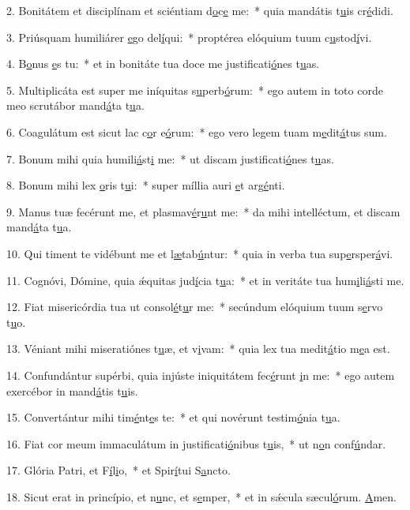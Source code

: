 2. Bonitátem et disciplínam et sciéntiam d\uline{o}c\uline{e} me:~* quia mandátis t\uline{u}is cr\uline{é}didi.\par 
3. Priúsquam humiliárer \uline{e}go del\uline{í}qui:~* proptérea elóquium tuum c\uline{u}stod\uline{í}vi.\par 
4. B\uline{o}nus \uline{e}s tu:~* et in bonitáte tua doce me justificati\uline{ó}nes t\uline{u}as.\par 
5. Multiplicáta est super me iníquitas s\uline{u}perb\uline{ó}rum:~* ego autem in toto corde meo scrutábor mand\uline{á}ta t\uline{u}a.\par 
6. Coagulátum est sicut lac c\uline{o}r e\uline{ó}rum:~* ego vero legem tuam m\uline{e}dit\uline{á}tus sum.\par 
7. Bonum mihi quia humili\uline{á}st\uline{i} me:~* ut discam justificati\uline{ó}nes t\uline{u}as.\par 
8. Bonum mihi lex \uline{o}ris t\uline{u}i:~* super míllia auri \uline{e}t arg\uline{é}nti.\par 
9. Manus tuæ fecérunt me, et plasmav\uline{é}r\uline{u}nt me:~* da mihi intelléctum, et discam mand\uline{á}ta t\uline{u}a.\par 
10. Qui timent te vidébunt me et l\uline{æ}tab\uline{ú}ntur:~* quia in verba tua sup\uline{e}rsper\uline{á}vi.\par 
11. Cognóvi, Dómine, quia ǽquitas jud\uline{í}cia t\uline{u}a:~* et in veritáte tua hum\uline{i}li\uline{á}sti me.\par 
12. Fiat misericórdia tua ut consol\uline{é}t\uline{u}r me:~* secúndum elóquium tuum s\uline{e}rvo t\uline{u}o.\par 
13. Véniant mihi miseratiónes t\uline{u}æ, et v\uline{i}vam:~* quia lex tua medit\uline{á}tio m\uline{e}a est.\par 
14. Confundántur supérbi, quia injúste iniquitátem fec\uline{é}runt \uline{i}n me:~* ego autem exercébor in mand\uline{á}tis t\uline{u}is.\par 
15. Convertántur mihi tim\uline{é}nt\uline{e}s te:~* et qui novérunt testim\uline{ó}nia t\uline{u}a.\par 
16. Fiat cor meum immaculátum in justificati\uline{ó}nibus t\uline{u}is,~* ut n\uline{o}n conf\uline{ú}ndar.\par 
17. Glória Patri, et F\uline{í}l\uline{i}o,~* et Spir\uline{í}tui S\uline{a}ncto.\par 
18. Sicut erat in princípio, et n\uline{u}nc, et s\uline{e}mper,~* et in sǽcula sæcul\uline{ó}rum. \uline{A}men.\par 
